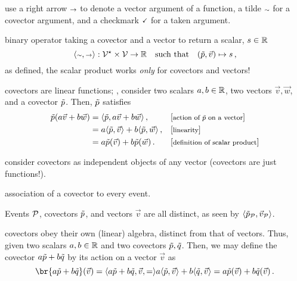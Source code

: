  use a right arrow ${\scriptstyle\rightarrow}$ to denote a vector argument of a function, a tilde ${\scriptstyle\sim}$ for a covector argument, and a checkmark ${\scriptstyle\checkmark}$ for a taken argument.

 binary operator taking a covector and a vector to return a scalar, $s\in\mathbb{R}$
%
\begin{equation*}
  \fdef{\sprod\cslot\vslot}{\dlspace V\setprod\lspace V}{\rspace}\suchthat\fmap{\tuple{\cov p, \vec v}}{s}\,,
\end{equation*}
%
 as defined, the scalar product works \emph{only} for covectors and vectors!

 covectors are linear functions; \ie, consider two scalars $a,b\in\mathbb{R}$, two vectors $\vec v,\vec w$, and a covector $\tilde{p}$. Then, $\tilde{p}$ satisfies
%
\begin{align}\label{eq:covectorpropertiesasmap}
  \cov p\vat{a\vec v + b\vec w} &= \sprod{\cov p}{a\vec v + b\vec w}                  \,, && \eqtxt{action of $\cov p$ on a vector} \\\nonumber
                                &= a\sprod{\cov p}{\vec v} + b\sprod{\cov p}{\vec w}  \,, && \eqtxt{linearity}              \\\nonumber
                                &= a\cov p\vat{\vec v} + b\cov p\vat{\vec w}          \,. && \eqtxt{definition of scalar product} \nonumber
\end{align}

 consider covectors as independent objects of any vector (covectors are just functions!).

 association of a covector to every event.

 Events $\mathcal{P}$, covectors $\tilde{p}$, and vectors $\vec v$ are all distinct, as seen by $\sprod{\cov p_\event{P}}{\vec v_\event{P}}$.

 covectors obey their own (linear) algebra, distinct from that of vectors. Thus, given two scalars $a,b\in\mathbb{R}$ and two covectors $\tilde{p},\tilde{q}$. Then, we may define the covector $a\tilde{p} + b\tilde{q}$ by its action on a vector $\vec v$ as
%
\begin{equation}\label{eq:dualvectorspace}
  \br{a\cov p + b\cov q}\vat{\vec v} = \sprod{a\cov p + b\cov q, \vec v} 
                                     = a\sprod{\cov p}{\vec v} + b\sprod{\cov q}{\vec v}
                                     = a\cov p\vat{\vec v} + b\cov q\vat{\vec v}\,.
\end{equation}

